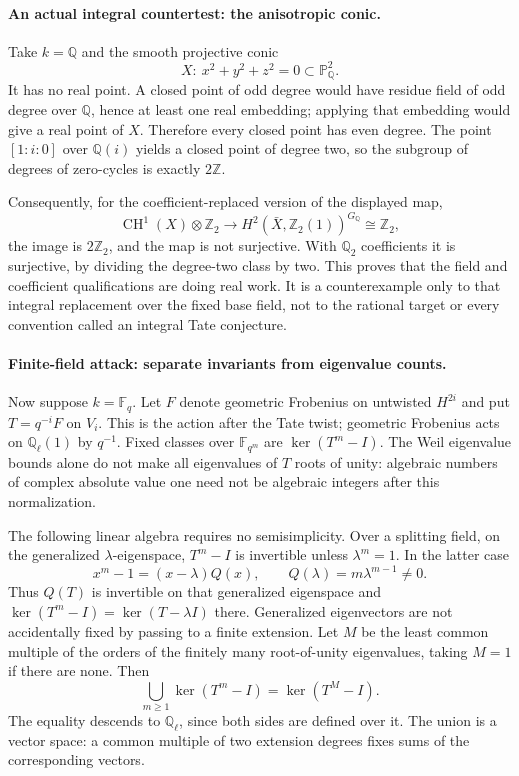 \documentclass[11pt]{article}
\begin{document}
\paragraph{An actual integral countertest: the anisotropic conic.}
Take $k=\mathbb Q$ and the smooth projective conic
\[
 X:\ x^2+y^2+z^2=0\subset\mathbb P^2_{\mathbb Q}.
\]
It has no real point. A closed point of odd degree would have residue
 field of odd degree over $\mathbb Q$, hence at least one real embedding;
 applying that embedding would give a real point of $X$. Therefore every
 closed point has even degree. The point $[1:i:0]$ over $\mathbb Q(i)$
 yields a closed point of degree two, so the subgroup of degrees of
 zero-cycles is exactly $2\mathbb Z$.

Consequently, for the coefficient-replaced version of the displayed map,
\[
 \operatorname{CH}^1(X)\otimes\mathbb Z_2
   \longrightarrow H^2(\bar X,\mathbb Z_2(1))^{G_{\mathbb Q}}
                 \cong\mathbb Z_2,
\]
 the image is $2\mathbb Z_2$, and the map is not surjective. With
 $\mathbb Q_2$ coefficients it is surjective, by dividing the degree-two
 class by two. This proves that the field and coefficient qualifications
 are doing real work. It is a counterexample only to that integral
 replacement over the fixed base field, not to the rational target or
 every convention called an integral Tate conjecture.

\paragraph{Finite-field attack: separate invariants from eigenvalue counts.}
Now suppose $k=\mathbb F_q$. Let $F$ denote geometric Frobenius on
 untwisted $H^{2i}$ and put $T=q^{-i}F$ on $V_i$. This is the action
 after the Tate twist; geometric Frobenius acts on $\mathbb Q_\ell(1)$
 by $q^{-1}$. Fixed classes over $\mathbb F_{q^m}$ are
 $\ker(T^m-I)$. The Weil eigenvalue bounds alone do not make all
 eigenvalues of $T$ roots of unity: algebraic numbers of complex absolute
 value one need not be algebraic integers after this normalization.

The following linear algebra requires no semisimplicity. Over a splitting
 field, on the generalized $\lambda$-eigenspace, $T^m-I$ is invertible
 unless $\lambda^m=1$. In the latter case
\[
 x^m-1=(x-\lambda)Q(x),\qquad Q(\lambda)=m\lambda^{m-1}\ne0.
\]
Thus $Q(T)$ is invertible on that generalized eigenspace and
 $\ker(T^m-I)=\ker(T-\lambda I)$ there. Generalized eigenvectors are not
 accidentally fixed by passing to a finite extension. Let $M$ be the
 least common multiple of the orders of the finitely many root-of-unity
 eigenvalues, taking $M=1$ if there are none. Then
\begin{equation}\label{tc:stabilize}
 \bigcup_{m\geq1}\ker(T^m-I)=\ker(T^M-I).
\end{equation}
The equality descends to $\mathbb Q_\ell$, since both sides are defined
 over it. The union is a vector space: a common multiple of two extension
 degrees fixes sums of the corresponding vectors.
\end{document}
